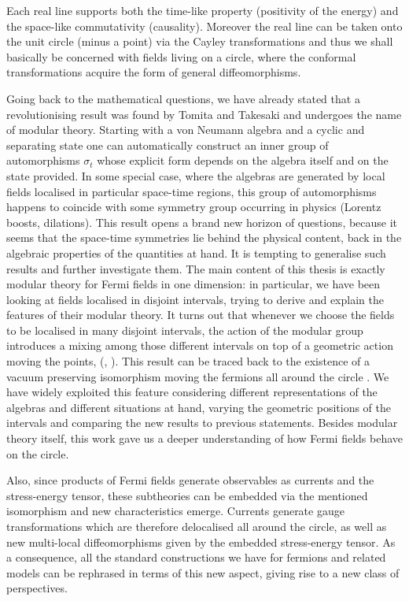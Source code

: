  \noindent Each real line supports both the time-like 
 property (positivity of the energy) and the
 space-like commutativity (causality). Moreover 
 the real line can be taken onto the unit circle (minus 
 a point) via the Cayley transformations and thus 
 we shall basically be concerned with fields living 
 on a circle, 
 where the conformal transformations acquire the 
 form of general diffeomorphisms.
 
 \bigskip 
 Going back to the mathematical questions, we have 
 already stated that a revolutionising result 
 was found by Tomita and Takesaki and undergoes 
 the name of modular theory. Starting with a von 
 Neumann algebra and a cyclic and separating state 
 one can automatically construct an inner group of 
 automorphisms $\sigma_t$ whose explicit form 
 depends on the algebra itself and on the state 
 provided. In some special case, where the algebras
 are generated by local fields localised in particular 
 space-time regions, this group of automorphisms 
 happens to coincide with some symmetry group 
 occurring in physics (Lorentz boosts, dilations). 
 This result opens a brand new horizon of questions, 
 because it seems that the space-time symmetries lie 
 behind the physical content, back in the algebraic 
 properties of the quantities at hand. It is tempting
 to generalise such results and further investigate them.
 The main content of this thesis is exactly modular theory 
 for Fermi fields in one dimension: in particular, we have 
 been looking at fields localised in disjoint intervals,
 trying to derive and explain the features of their modular 
 theory. It turns out that whenever we choose the fields 
 to be localised in many disjoint intervals, the action of 
 the modular group 
 introduces a mixing among those different intervals on top 
 of a geometric action moving the points, 
 (\cite{CH:2009}, \cite{LMR:2009}). 
 This result can be traced back to the existence of 
 a vacuum preserving isomorphism moving the fermions 
 all around the circle \cite{Rehren:2012wa}. We have
 widely exploited this feature considering different 
 representations of the algebras and different situations 
 at hand, varying the geometric positions of the intervals 
 and comparing the new results to previous statements.
 Besides modular theory itself, this work gave us a 
 deeper understanding of how Fermi fields behave on the
 circle.
 
 Also, since products of Fermi fields generate observables
 as currents and the stress-energy tensor, these subtheories 
 can be embedded via the mentioned isomorphism and new 
 characteristics emerge. Currents generate gauge transformations
 which are therefore delocalised all around the circle, as 
 well as new multi-local diffeomorphisms given by the 
 embedded stress-energy tensor. As a consequence, all the
 standard constructions we have for fermions and related 
 models can be rephrased in terms of this new aspect,
 giving rise to a new class of perspectives.
 
